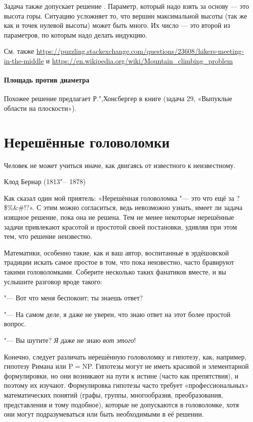 \documentclass[twoside]{book}
\begin{document}
Задача также допускает решение .
Параметр, который надо взять за основу --- это высота горы. Ситуацию усложняет то, что вершин максимальной высоты (так же как и точек нулевой высоты) может быть много. Их число --- это второй из параметров, по которым надо делать индукцию.

См. также \url{https://puzzling.stackexchange.com/questions/23608/hikers-meeting-in-the-middle}
и \url{https://en.wikipedia.org/wiki/Mountain_climbing_problem}


\subsubsection{Площадь против диаметра}
Похожее решение предлагает Р.",Хонсбергер  в книге  
(задача 29, «Выпуклые области на плоскости»). 



\chapter{Нерешённые головоломки}

\setlength{\epigraphwidth}{.55\textwidth}
\epigraph{Человек не может учиться иначе, как двигаясь от известного к неизвестному.\vspace{1ex}}{Клод Бернар (1813"--~1878)}

Как сказал один мой приятель: «Нерешённая головоломка "--- это что ещё за ?\$\%\&\#\@!?».
С этим можно согласиться, ведь невозможно узнать, имеет ли задача изящное решение, пока она не решена.
Тем не менее некоторые нерешённые задачи привлекают красотой и простотой своей постановки, удивляя при этом тем, что решение неизвестно.

Математики, особенно такие, как и ваш автор, воспитанные в эрдёшовской традиции искать самое простое в том, что пока неизвестно, часто бравируют такими головоломками.
Соберите несколько таких фанатиков вместе, и вы услышите разговор вроде такого:

"--- Вот что меня беспокоит; ты знаешь ответ?

"--- На самом деле, я даже не уверен, что знаю ответ на этот более простой вопрос.

"--- Вы шутите? \emph{Я} даже не знаю \emph{вот этого}!

Конечно, следует различать нерешённую головоломку и гипотезу, как, например, гипотезу Римана или P${}={}$NP.
Гипотезы могут не иметь красивой и элементарной формулировки, но они возникают на пути к истине (часто как препятствия), и поэтому их изучают.
Формулировка гипотезы часто требует «профессиональных» математических понятий (графы, группы, многообразия, преобразования, представления и тому подобное), которые не допускаются в головоломке, хотя они могут подразумеваться или быть необходимыми в её решении.
\end{document}
